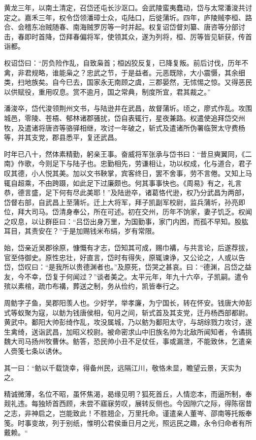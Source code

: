 \documentclass[12pt,UTF8]{ctexbook}
\begin{document}
黄龙三年，以南土清定，召岱还屯长沙沤口。会武陵蛮夷蠢动，岱与太常潘浚共讨定之。嘉禾三年，权令岱领潘璋士众，屯陆口，后徙蒲圻。四年，庐陵贼李桓、路合、会稽东冶贼随春、南海贼罗厉等一时并起。权复诏岱督刘纂、唐咨等分部讨击，春即时首降，岱拜春偏将军，使领其众，遂为列将，桓、厉等皆见斩获，传首诣都。

权诏岱曰：“厉负险作乱，自致枭首；桓凶狡反复，已降复叛。前后讨伐，历年不禽，非君规略，谁能枭之？忠武之节，于是益者。元恶既除，大小震慑，其余细类，扫地族矣。自今巳去，国家永无南顾之虞，三郡晏然，无怵惕之惊。又得恶民以供赋役，重用叹息。赏不逾月，国之常典，制度所宜，君其裁之。”

潘浚卒，岱代浚领荆州文书，与陆逊井在武昌，故督蒲圻。顷之，廖式作乱。攻围城邑，零陵、苍梧、郁林诸郡骚扰，岱自表辄行，星夜兼路。权遣使追拜岱交州牧，及遣诸将唐咨等骆驿相继，攻讨一年破之，斩式及遣诸所伪署临贺太守费杨等，并其支党，郡县悉平，复还武昌。

时年已八十，然体素精勤，躬亲王事。奋威将军张承与岱书曰：“昔旦奭翼同，《二南》作歌，今则足下与陆子也。忠勤相先，劳谦相让，功以权成，化与道合，君子叹其德，小人悦其美。加以文书鞅掌，宾客终日，罢不舍事，劳不言倦。又知上马辄自超乘，不由跨蹑，如此足下过廉颇也。何其事事快也。《周易》有之，礼言恭，德言盛，足下何有尽此美耶！”及陆逊卒，诸葛恪代逊，权乃分武昌为两部，岱督右部，自武昌上至蒲圻。迁上大将军，拜子凯副军校尉，监兵蒲圻，孙亮即位，拜大司马。岱清身奉公，所在可述。初在交州，历年不饷家，妻子饥乏。权闻之叹息，以让群臣曰：“吕岱出身万里，为国勤事，家门内困，而孤不早知。股肱耳目，其责安在？”于是加赐钱米布绢，岁有常限。

始，岱亲近吴郡徐原，慷慨有才志，岱知其可成，赐巾褠，与共言论，后遂荐拔，官至侍御史。原性忠壮，好直言，岱时有得失，原辄谏诤，又公论之，人或以告岱，岱叹曰：“是我所以贵德渊者也。”及原死，岱哭之甚哀。曰：“德渊，吕岱之益友，今不幸，岱复于何闻过？”谈者美之。太平元年，年九十六卒，子凯嗣。遣令殡以素棺，疏巾布褠，葬送之制，务从俭约，凯皆奉行之。

周鲂字子鱼，吴郡阳羡人也。少好学，举孝廉，为宁国长，转在怀安。钱唐大帅彭式等蚁聚为寇，以鲂为钱唐侯相，旬月之间，斩式首及其支党，迁丹杨西部都尉。黄武中。鄱阳大帅彭绮作乱，攻没属城，乃以鲂为鄱阳太守，与胡综戮力攻讨，遂生禽绮，送诣武昌，加昭义校尉。被命密求山中旧族名帅为北敌所闻知者，令谲挑魏大司马扬州牧曹休。鲂答，恐民帅小丑不足仗任，事或漏泄，不能致休，乞遣亲人赍笺七条以诱休。

其一曰：“鲂以千载饶幸，得备州民，远隔江川，敬恪未显，瞻望云景，天实为之。

精诚微薄，名位不昭，虽怀焦渴，曷缘见明？狐死首丘，人情恋本，而逼所制，奉觌礼违。每独矫首西顾，未尝不寤寐劳叹，展转反侧也。今因隙穴之际，得陈宿昔之志，非神启之，岂能致此！不胜翘企，万里托命。谨遣亲人董岑、邵南等托叛奉笺。时事变故，列于别纸，惟明公君侯垂日月之光，照远民之趣，永令归命者有所戴赖。“
\end{document}
